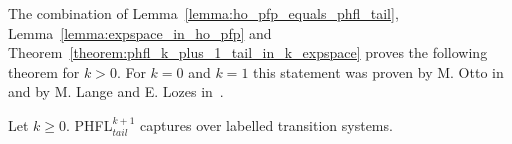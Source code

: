 The combination of Lemma~\ref{lemma:ho_pfp_equals_phfl_tail}, Lemma~\ref{lemma:expspace_in_ho_pfp} and 
Theorem~\ref{theorem:phfl_k_plus_1_tail_in_k_expspace} proves the following theorem for $k>0$. For $k = 0$ and $k = 1$ this statement was proven by M. Otto in~\cite{otto1999bisimulation} and by M. Lange and E. Lozes in~\cite{lange2014capturing}.

\begin{theorem}
    Let $k \geq 0$. PHFL$^{k+1}_{tail}$ captures  over labelled transition systems.
\end{theorem}